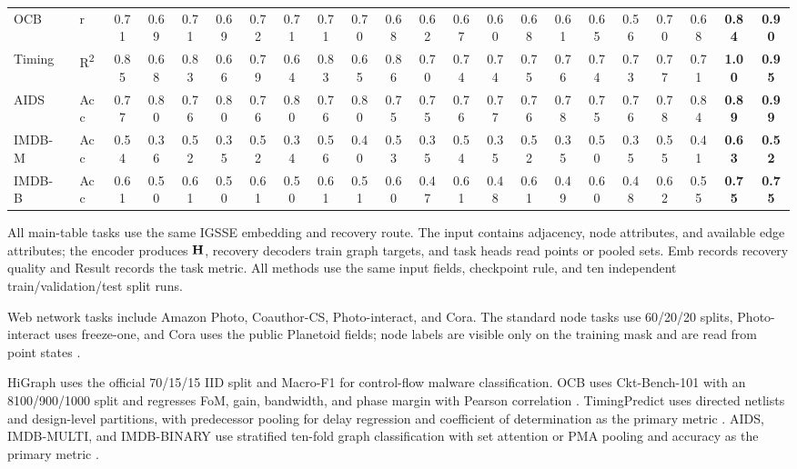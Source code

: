\begin{table}[t]
{\begin{tabular}{llcccccccccccccccccccc}
    OCB~\cite{dong2023cktgnn} & r & 0.71 & 0.69 & 0.71 & 0.69 & 0.72 & 0.71 & 0.71 & 0.70 & 0.68 & 0.62 & 0.67 & 0.60 & 0.68 & 0.61 & 0.65 & 0.56 & 0.70 & 0.68 & \textbf{0.84} & \textbf{0.90} \\
    Timing~\cite{guo2022timing} & R\textsuperscript{2} & 0.85 & 0.68 & 0.83 & 0.66 & 0.79 & 0.64 & 0.83 & 0.65 & 0.86 & 0.70 & 0.74 & 0.74 & 0.75 & 0.76 & 0.74 & 0.73 & 0.77 & 0.71 & \textbf{1.00} & \textbf{0.95} \\
    AIDS~\cite{morris2020} & Acc & 0.77 & 0.80 & 0.76 & 0.80 & 0.76 & 0.80 & 0.76 & 0.80 & 0.75 & 0.75 & 0.76 & 0.77 & 0.76 & 0.78 & 0.75 & 0.76 & 0.78 & 0.84 & \textbf{0.89} & \textbf{0.99} \\
    IMDB-M~\cite{yang2015} & Acc & 0.54 & 0.36 & 0.52 & 0.35 & 0.52 & 0.34 & 0.56 & 0.40 & 0.53 & 0.35 & 0.54 & 0.35 & 0.52 & 0.35 & 0.50 & 0.35 & 0.55 & 0.41 & \textbf{0.63} & \textbf{0.52} \\
    IMDB-B~\cite{yang2015} & Acc & 0.61 & 0.50 & 0.61 & 0.50 & 0.61 & 0.50 & 0.61 & 0.51 & 0.60 & 0.47 & 0.61 & 0.48 & 0.61 & 0.49 & 0.60 & 0.48 & 0.62 & 0.55 & \textbf{0.75} & \textbf{0.75} \\
    \bottomrule
  \end{tabular}}
\end{table}

All main-table tasks use the same IGSSE embedding and recovery route.  The input
contains adjacency, node attributes, and available edge attributes; the encoder
produces $\mathbf{H}$, recovery decoders train graph targets, and task heads read
points or pooled sets.  Emb records recovery quality and Result records the
task metric.  All methods use the same input fields, checkpoint rule, and ten
independent train/validation/test split runs.

Web network tasks include Amazon Photo, Coauthor-CS, Photo-interact, and Cora.
The standard node tasks use 60/20/20 splits, Photo-interact uses freeze-one,
and Cora uses the public Planetoid fields; node labels are visible only on the
training mask and are read from point states \cite{shchur2018,sen2008,yang2016}.

HiGraph uses the official 70/15/15 IID split and Macro-F1 for control-flow
malware classification.  OCB uses Ckt-Bench-101 with an 8100/900/1000 split
and regresses FoM, gain, bandwidth, and phase margin with Pearson correlation
\cite{dong2023cktgnn}.  TimingPredict uses directed netlists and design-level
partitions, with predecessor pooling for delay regression and coefficient of
determination as the primary metric \cite{guo2022timing}.  AIDS, IMDB-MULTI,
and IMDB-BINARY use stratified ten-fold graph classification with set attention
or PMA pooling and accuracy as the primary metric \cite{morris2020,yang2015}.

